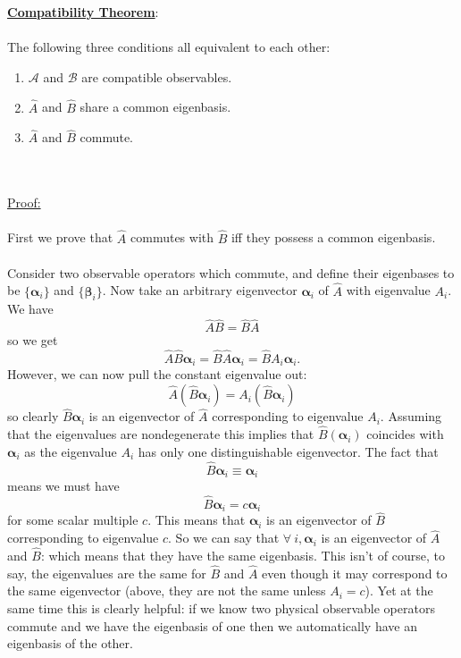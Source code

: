 \underline{\textbf{Compatibility Theorem}}:\\\\
The following three conditions all equivalent to each other:
\begin{enumerate}
    \item $\mathcal{A}$ and $\mathcal{B}$ are compatible observables.
    \item $\hat{A}$ and $\hat{B}$ share a common eigenbasis.
    \item $\hat{A}$ and $\hat{B}$ commute.
\end{enumerate}
\\\\
\underline{Proof:}
\\\\
First we prove that $\hat{A}$ commutes with $\hat{B}$ iff they possess a common eigenbasis. \\\\ Consider two observable operators which commute, and define their eigenbases to be $\{\bm{\alpha}_{i}\}$ and $\{\bm{\beta}_{i}\}$. Now take an arbitrary eigenvector $\bm{\alpha}_{i}$ of $\hat{A}$ with eigenvalue $A_{i}$. We have
$$
\hat{A}\hat{B}=\hat{B}\hat{A}
$$
so we get 
$$
\hat{A}\hat{B}\bm{\alpha}_{i}=\hat{B}\hat{A}\bm{\alpha}_{i}=\hat{B}A_{i}\bm{\alpha}_{i}.
$$
However, we can now pull the constant eigenvalue out:
$$
\hat{A}(\hat{B}\bm{\alpha}_{i})=A_{i}(\hat{B}\bm{\alpha}_{i})
$$
so clearly $\hat{B}\bm{\alpha}_{i}$ is an eigenvector of $\hat{A}$ corresponding to eigenvalue $A_{i}$. Assuming that the eigenvalues are nondegenerate this implies that $\hat{B}(\bm{\alpha}_{i})$ coincides with $\bm{\alpha}_{i}$ as the eigenvalue $A_{i}$ has only one distinguishable eigenvector. The fact that 
$$
\hat{B}\bm{\alpha}_{i}\equiv\bm{\alpha}_{i}
$$
means we must have
$$
\hat{B}\bm{\alpha}_{i}=c\bm{\alpha}_{i}
$$
for some scalar multiple $c$. This means that $\bm{\alpha}_{i}$ is an eigenvector of $\hat{B}$ corresponding to eigenvalue $c$. So we can say that $\forall\:i, \bm{\alpha}_{i}$ is an eigenvector of $\hat{A}$ and $\hat{B}$: which means that they have the same eigenbasis. This isn't of course, to say, the eigenvalues are the same for $\hat{B}$ and $\hat{A}$ even though it may correspond to the same eigenvector (above, they are not the same unless $A_{i}=c$). Yet at the same time this is clearly helpful: if we know two physical observable operators commute and we have the eigenbasis of one then we automatically have an eigenbasis of the other. 
\\\\
